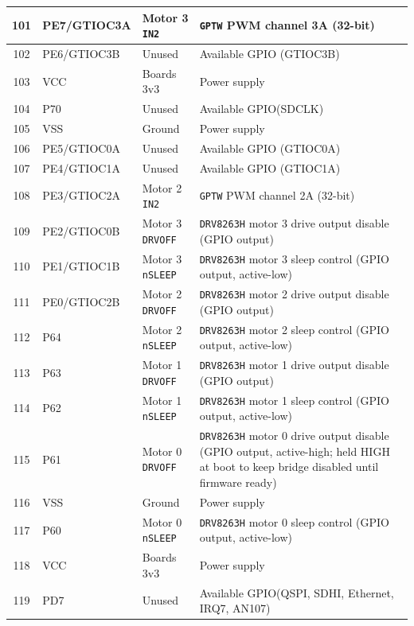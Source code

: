 \begin{longtable} { | c | l | l | p{5cm} |}
\hline
\rowcolor{blue!20}
101 & PE7/GTIOC3A & Motor 3 \texttt{IN2} & \texttt{GPTW} PWM channel 3A (32-bit) \\
\hline
102 & PE6/GTIOC3B & Unused & Available GPIO (GTIOC3B) \\
\hline
\rowcolor{gray!15}
103 & VCC &Boards 3v3 & Power supply \\
\hline
104 & P70 & Unused &Available GPIO(SDCLK) \\
\hline
\rowcolor{gray!15}
105 & VSS & Ground &Power supply \\
\hline
106 & PE5/GTIOC0A & Unused & Available GPIO (GTIOC0A) \\
\hline
107 & PE4/GTIOC1A & Unused & Available GPIO (GTIOC1A) \\
\hline
\rowcolor{blue!20}
108 & PE3/GTIOC2A & Motor 2 \texttt{IN2} & \texttt{GPTW} PWM channel 2A (32-bit) \\
\hline
\rowcolor{blue!20}
109 & PE2/GTIOC0B & Motor 3 \texttt{DRVOFF} & \texttt{DRV8263H} motor 3 drive output disable (GPIO output) \\
\hline
\rowcolor{blue!20}
110 & PE1/GTIOC1B & Motor 3 \texttt{nSLEEP} & \texttt{DRV8263H} motor 3 sleep control (GPIO output, active-low) \\
\hline
\rowcolor{blue!20}
111 & PE0/GTIOC2B & Motor 2 \texttt{DRVOFF} & \texttt{DRV8263H} motor 2 drive output disable (GPIO output) \\
\hline
\rowcolor{blue!20}
112 & P64 & Motor 2 \texttt{nSLEEP} & \texttt{DRV8263H} motor 2 sleep control (GPIO output, active-low) \\
\hline
\rowcolor{blue!20}
113 & P63 & Motor 1 \texttt{DRVOFF} & \texttt{DRV8263H} motor 1 drive output disable (GPIO output) \\
\hline
\rowcolor{blue!20}
114 & P62 & Motor 1 \texttt{nSLEEP} & \texttt{DRV8263H} motor 1 sleep control (GPIO output, active-low) \\
\hline
\rowcolor{blue!20}
115 & P61 & Motor 0 \texttt{DRVOFF} & \texttt{DRV8263H} motor 0 drive output disable (GPIO output, active-high; held HIGH at boot to keep bridge disabled until firmware ready) \\
\hline
\rowcolor{gray!15}
116 & VSS & Ground &Power supply \\
\hline
\rowcolor{blue!20}
117 & P60 & Motor 0 \texttt{nSLEEP} & \texttt{DRV8263H} motor 0 sleep control (GPIO output, active-low) \\
\hline
\rowcolor{gray!15}
118 & VCC &Boards 3v3 & Power supply \\
\hline
119 & PD7 & Unused &Available GPIO(QSPI, SDHI, Ethernet, IRQ7, AN107) \\

\end{longtable}
